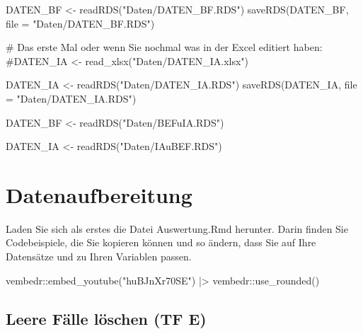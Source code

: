 \documentclass[twoside, pagesize, fontsize=11pt, dvipsnames]{scrreport}
\newenvironment{Shaded}{\begin{snugshade}}{\end{snugshade}}
\newcommand{\AttributeTok}[1]{\textcolor[rgb]{0.40,0.45,0.13}{#1}}
\newcommand{\CommentTok}[1]{\textcolor[rgb]{0.37,0.37,0.37}{#1}}
\newcommand{\FunctionTok}[1]{\textcolor[rgb]{0.28,0.35,0.67}{#1}}
\newcommand{\NormalTok}[1]{\textcolor[rgb]{0.00,0.23,0.31}{#1}}
\newcommand{\OtherTok}[1]{\textcolor[rgb]{0.00,0.23,0.31}{#1}}
\newcommand{\SpecialCharTok}[1]{\textcolor[rgb]{0.37,0.37,0.37}{#1}}
\newcommand{\StringTok}[1]{\textcolor[rgb]{0.13,0.47,0.30}{#1}}
\begin{document}
\begin{Shaded}
\begin{Highlighting}[]
\NormalTok{DATEN\_BF }\OtherTok{\textless{}{-}} \FunctionTok{readRDS}\NormalTok{(}\StringTok{"Daten/DATEN\_BF.RDS"}\NormalTok{)}
\FunctionTok{saveRDS}\NormalTok{(DATEN\_BF, }\AttributeTok{file =} \StringTok{"Daten/DATEN\_BF.RDS"}\NormalTok{)}

\CommentTok{\# Das erste Mal oder wenn Sie nochmal was in der Excel editiert haben:}
\CommentTok{\#DATEN\_IA \textless{}{-} read\_xlsx("Daten/DATEN\_IA.xlsx")}

\NormalTok{DATEN\_IA }\OtherTok{\textless{}{-}} \FunctionTok{readRDS}\NormalTok{(}\StringTok{"Daten/DATEN\_IA.RDS"}\NormalTok{)}
\FunctionTok{saveRDS}\NormalTok{(DATEN\_IA, }\AttributeTok{file =} \StringTok{"Daten/DATEN\_IA.RDS"}\NormalTok{)}

\NormalTok{DATEN\_BF }\OtherTok{\textless{}{-}} \FunctionTok{readRDS}\NormalTok{(}\StringTok{"Daten/BEFuIA.RDS"}\NormalTok{)}

\NormalTok{DATEN\_IA }\OtherTok{\textless{}{-}} \FunctionTok{readRDS}\NormalTok{(}\StringTok{"Daten/IAuBEF.RDS"}\NormalTok{)}
\end{Highlighting}
\end{Shaded}


\hypertarget{datenaufbereitung}{%
\chapter{Datenaufbereitung}\label{datenaufbereitung}}

Laden Sie sich als erstes die Datei Auswertung.Rmd herunter. Darin
finden Sie Codebeispiele, die Sie kopieren können und so ändern, dass
Sie auf Ihre Datensätze und zu Ihren Variablen passen.

\begin{Shaded}
\begin{Highlighting}[]
\NormalTok{ vembedr}\SpecialCharTok{::}\FunctionTok{embed\_youtube}\NormalTok{(}\StringTok{"huBJnXr70SE"}\NormalTok{) }\SpecialCharTok{|\textgreater{}} 
\NormalTok{  vembedr}\SpecialCharTok{::}\FunctionTok{use\_rounded}\NormalTok{()}
\end{Highlighting}
\end{Shaded}

\hypertarget{leere-fuxe4lle-luxf6schen-tf-e}{%
\section{Leere Fälle löschen (TF
E)}\label{leere-fuxe4lle-luxf6schen-tf-e}}
\end{document}
